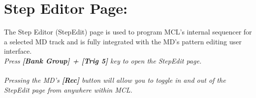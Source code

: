 \chapter{Step Editor Page:}
The Step Editor (StepEdit) page is used to program MCL's internal sequencer for a selected MD track and is fully integrated with the MD's pattern editing user interface.
\\
\textit{Press \textbf{[Bank Group] + [Trig 5]} key to open the StepEdit page.}\\\\
\textit{Pressing the MD's \textbf{[Rec]} button will allow you to toggle in and out of the StepEdit page from anywhere within MCL.}

\newpage
